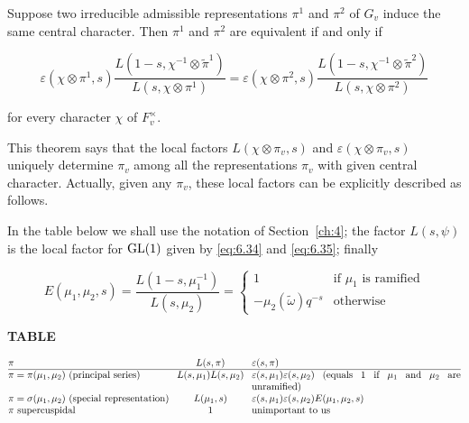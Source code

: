 \begin{theorem}\label{thm:6.14}

Suppose two irreducible admissible representations $\pi^1$ and $\pi^2$ of $G_v$ induce the same central character. Then $\pi^1$ and $\pi^2$ are equivalent if and only if

\begin{equation}\label{eq:6.38}
\varepsilon(\chi \otimes \pi^1, s) \frac{L(1 - s, \chi^{-1} \otimes \tilde{\pi}^1)}{L(s, \chi \otimes \pi^1)} = \varepsilon(\chi \otimes \pi^2, s) \frac{L(1 - s, \chi^{-1} \otimes \tilde{\pi}^2)}{L(s, \chi \otimes \pi^2)}\tag{6.38}
\end{equation}

for every character $\chi$ of $F_v^{\times}$.

\end{theorem}

This theorem says that the local factors $L(\chi \otimes \pi_v, s)$ and $\varepsilon(\chi \otimes \pi_v, s)$ uniquely determine $\pi_v$ among all the representations $\pi_v$ with given central character. Actually, given any $\pi_v$, these local factors can be explicitly described as follows.

\begin{theorem}\label{thm:6.15}

In the table below we shall use the notation of Section~\ref{ch:4}; the factor $L(s, \psi)$ is the local factor for $\operatorname{GL}(1)$ given by \eqref{eq:6.34} and \eqref{eq:6.35}; finally

\[
E(\mu_1, \mu_2, s) = \frac{L(1 - s, \mu_1^{-1})}{L(s, \mu_2)} = \begin{cases} 1 & \text{if } \mu_1 \text{ is ramified} \\ -\mu_2(\tilde{\omega})q^{-s} & \text{otherwise} \end{cases}
\]

\textbf{TABLE}

{\small

\[
\begin{array}{@{}l@{\hspace{0.8em}}c@{\hspace{0.8em}}p{7.5cm}@{}}
\pi & L(s, \pi) & $\varepsilon(s, \pi)$\\ \hline
\pi = \pi(\mu_1, \mu_2) \ (\text{principal series}) & L(s, \mu_1)L(s, \mu_2) & $\varepsilon(s, \mu_1)\varepsilon(s, \mu_2)$ (equals 1 if $\mu_1$ and $\mu_2$ are unramified)\\
\pi = \sigma(\mu_1, \mu_2) \ (\text{special representation}) & L(\mu_1, s) & $\varepsilon(s, \mu_1)\varepsilon(s, \mu_2)E(\mu_1, \mu_2, s)$\\
\pi \ \text{supercuspidal} & 1 & unimportant to us
\end{array}
\]

}

\end{theorem}

